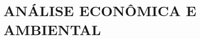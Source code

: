 \documentclass[12pt, a4paper]{article}
\begin{document}
\pagestyle{myheadings}







\newpage
\section{ANÁLISE ECONÔMICA E AMBIENTAL}


\newpage


%
\providecommand*{\refname}{}
\renewcommand*{\refname}{\begin{center}\textbf{REFERÊNCIAS}\end{center}}

\newpage
\vspace*{4cm}

\pagestyle{empty}
\pagestyle{myheadings}

%



\end{document}
